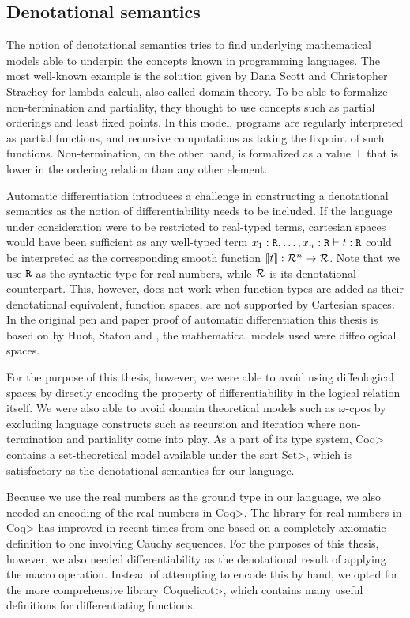 \subsection{Denotational semantics}
The notion of denotational semantics tries to find underlying mathematical models able to underpin the concepts known in programming languages. The most well-known example is the solution given by Dana Scott and Christopher Strachey\cite{Scott1977} for lambda calculi, also called domain theory.
To be able to formalize non-termination and partiality, they thought to use concepts such as partial orderings and least fixed points\cite{aaby2020}.
In this model, programs are regularly interpreted as partial functions, and recursive computations as taking the fixpoint of such functions.
Non-termination, on the other hand, is formalized as a value $\bot$ that is lower in the ordering relation than any other element.

Automatic differentiation introduces a challenge in constructing a denotational semantics as the notion of differentiability needs to be included.
If the language under consideration were to be restricted to real-typed terms, cartesian spaces would have been sufficient as any well-typed term $x_1 : \texttt{R}, \dots, x_n : \texttt{R} \vdash t : \texttt{R}$ could be interpreted as the corresponding smooth function $\llbracket t \rrbracket : \mathcal{R}^n \to \mathcal{R}$.
Note that we use $\texttt{R}$ as the syntactic type for real numbers, while $\mathcal{R}$ is its denotational counterpart.
This, however, does not work when function types are added as their denotational equivalent, function spaces, are not supported by Cartesian spaces\cite{huot2020correctness}.
In the original pen and paper proof of automatic differentiation this thesis is based on by Huot, Staton and \Vakar{}\cite{huot2020correctness}, the mathematical models used were diffeological spaces.

For the purpose of this thesis, however, we were able to avoid using diffeological spaces by directly encoding the property of differentiability in the logical relation itself.
We were also able to avoid domain theoretical models such as $\omega$-cpos by excluding language constructs such as recursion and iteration where non-termination and partiality come into play.
As a part of its type system, \<Coq> contains a set-theoretical model available under the sort \<Set>, which is satisfactory as the denotational semantics for our language.

Because we use the real numbers as the ground type in our language, we also needed an encoding of the real numbers in \<Coq>.
The library for real numbers in \<Coq> has improved in recent times from one based on a completely axiomatic definition to one involving Cauchy sequences.
For the purposes of this thesis, however, we also needed differentiability as the denotational result of applying the macro operation.
Instead of attempting to encode this by hand, we opted for the more comprehensive library \<Coquelicot>\cite{Boldo2015CoquelicotAU}, which contains many useful definitions for differentiating functions.
